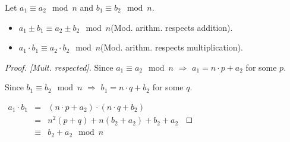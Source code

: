 \begin{frame}
\vskip -0.17cm
\begin{lemma}
Let $a_1 \equiv a_2 \mod n$ and $b_1\equiv b_2 \mod n$. 
\begin{itemize}
\item $a_1\pm b_1 \equiv a_2 \pm b_2 \mod n$\hfill (Mod. arithm. respects addition).
\item $a_1\cdot b_1 \equiv a_2 \cdot b_2 \mod n$\hfill  (Mod. arithm. respects multiplication).
\end{itemize}
\end{lemma}
\vskip -0.17cm
\begin{proof}[Proof. {[Mult. respected]}]
Since $a_1 \equiv a_2  \mod n$ $\Rightarrow$ $a_1 = n\cdot p + a_2 $ for some $p$.

Since $b_1 \equiv b_2  \mod n$ $\Rightarrow$ $b_1 = n\cdot q + b_2 $ for some $q$.	

\hfil\hfil  $\begin{array}{rclll}
a_1 \cdot b_1 &=& ( n\cdot p + a_2)\cdot (n\cdot q + b_2 ) \\
&=& n^2 (p+q) + n(b_2+a_2) + b_2 + a_2 \\
&\equiv& b_2 + a_2\mod n
\end{array}
$
\end{proof}

\vskip -0.17cm
\end{frame}